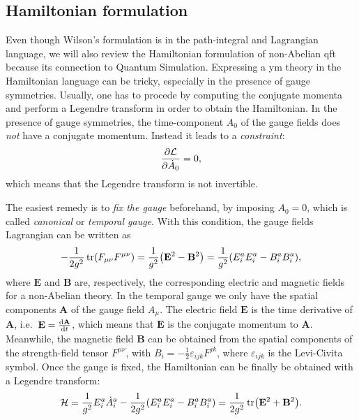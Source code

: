 \subsection{Hamiltonian formulation}
\label{sub:hamiltonian_formulation}

Even though Wilson's formulation \cite{wilson1974confinement} is in the path-integral and Lagrangian language, we will also review the Hamiltonian formulation of non-Abelian \ac{qft} because its connection to Quantum Simulation.
Expressing a \ac{ym} theory in the Hamiltonian language can be tricky, especially in the presence of gauge symmetries.
Usually, one has to procede by computing the conjugate momenta and perform a Legendre transform in order to obtain the Hamiltonian.
In the presence of gauge symmetries, the time-component $A_0$ of the gauge fields does \emph{not} have a conjugate momentum.
Instead it leads to a \emph{constraint}:
\begin{equation}
    \pdv{\mathcal{L}}{\dot{A}_0} = 0,
\end{equation}
which means that the Legendre transform is not invertible.

The easiest remedy is to \emph{fix the gauge} beforehand, by imposing $A_0 = 0$, which is called \emph{canonical} or \emph{temporal gauge}.
With this condition, the gauge fields Lagrangian can be written as
\begin{equation}
    - \frac{1}{2 g^2} \tr(F_{\mu \nu} F^{\mu \nu})
    = \frac{1}{g^2} \qty( \mathbf{E}^2 - \mathbf{B}^2 )
    = \frac{1}{g^2} \qty(E^a_i E^a_i - B^a_i B^a_i),
    \label{eq:YM_lagrang_temporal_gauge}
\end{equation}
where $\mathbf{E}$ and $\mathbf{B}$ are, respectively, the corresponding electric and magnetic fields for a non-Abelian theory.
In the temporal gauge we only have the spatial components $\mathbf{A}$ of the gauge field $A_{\mu}$.
The electric field $\mathbf{E}$ is the time derivative of $\mathbf{A}$, i.e.~$\mathbf{E} = \dv{\mathbf{A}}{t}$,
which means that $\mathbf{E}$ is the conjugate momentum to $\mathbf{A}$.
Meanwhile, the magnetic field $\mathbf{B}$ can be obtained from the spatial components of the strength-field tensor $F^{\mu \nu}$, with $B_i = - \frac{1}{2} \varepsilon_{ijk} F^{jk}$, where $\varepsilon_{ijk}$ is the Levi-Civita symbol.
Once the gauge is fixed, the Hamiltonian can be finally be obtained with a Legendre transform:
\begin{equation}
    \mathcal{H}
    = \frac{1}{g^2} E^a_i \dot{A}^a_i - \frac{1}{2 g^2} \qty( E^a_i E^a_i - B^a_i B^a_i )
    = \frac{1}{2g^2} \tr ( \mathbf{E}^2 + \mathbf{B}^2 ).
\end{equation}

